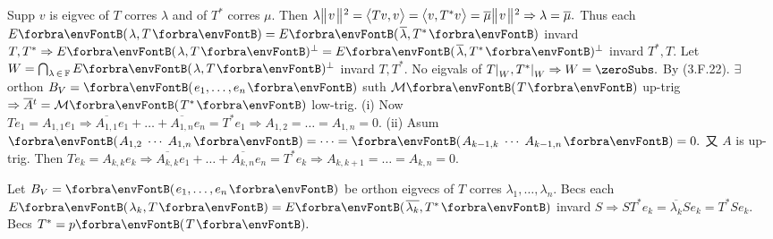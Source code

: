 Supp $v$ is eigvec of $T$ corres $\lambda$ and of $T^*$ corres $\mu.$\parSol{}
Then $\lambda\big\Vert\hspace{1pt}{}v{}\hspace{1pt}\big\Vert{\hspace{0.5pt}}{^2}=\big\langle{}Tv,v{}\big\rangle=\big\langle{}v,T^*v{}\big\rangle=\overline{\mu}\big\Vert\hspace{1pt}{}v{}\hspace{1pt}\big\Vert{\hspace{0.5pt}}{^2}\Rightarrow\lambda=\overline{\mu}.$\parSol{}
Thus each $E\Par{\lambda,T}=E\Par{\overline{\lambda},T^*}$ invard $T,T^*\Rightarrow E\Par{\lambda,T}{^\perp}=E\Par{\overline{\lambda},T^*}{^\perp}$ invard $T^*,T.$\parSol{}
Let $W=\bigcap_{\lambda\,\in\,\Fbb}E\Par{\lambda,T}{^\perp}$ invard $T,T^*.$ No eigvals of $T\mmid_W,T^*\mmid_W\Rightarrow W=\zeroSubs.$ By (3.F.22).\PfEnd\vspace{4pt}\parSol{}
\Or $\exists$ orthon $B_V=\Par{e_1,\dots,e_n}$ suth $\Mt{T}$ up-trig $\Rightarrow\overline{A}{^t}=\Mt{T^*}$ low-trig.\parSol{}
(i) Now $Te_1=A_{1,1}e_1\Rightarrow\overline{A_{1,1}}e_1+\dots+\overline{A_{1,n}}e_n=T^*e_1\Rightarrow A_{1,2}=\dots=A_{1,n}=0.$\parSol{}
(ii) Asum $\Par{A_{1,2}\;\cdots\;A_{1,n}}=\dots=\Par{A_{k-1,k}\;\cdots\;A_{k-1,n}}=0.$ 又 $A$ is up-trig.\vspace{1pt}\parSol{\Hii}
Then $Te_{k}=A_{k,k}e_{k}\Rightarrow\overline{A_{k,k}}e_1+\dots+\overline{A_{k,n}}e_n=T^*e_{k}\Rightarrow A_{k,k+1}=\dots=A_{k,n}=0.$\PfEnd
\SepLine


Let $B_V=\Par{e_1,\dots,e_n}$ be orthon eigvecs of $T$ corres $\lambda_1,\dots,\lambda_n.$\parSol{}
Becs each $E\Par{\lambda_k,T}=E\Par{\overline{\lambda_k},T^*}$ invard $S\Rightarrow ST^*e_k=\overline{\lambda_k}Se_k=T^*Se_k.$ \;\Or Becs $T^*=p\Par{T}.$\PfEnd
\SepLine


